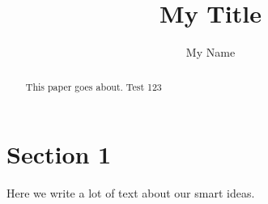 \documentclass{article}
\begin{document}
\title{My Title}
\author{My Name}
\maketitle

\begin{abstract}
This paper goes about.
Test 123
\end{abstract}

\section{Section 1}
Here we write a lot of text about our smart ideas.
\cite{Eckert2007}


\end{document}
